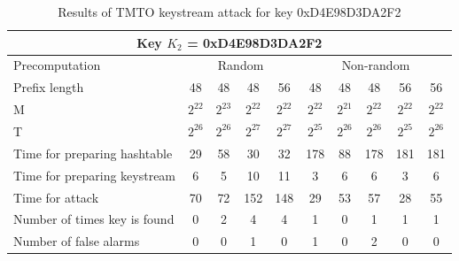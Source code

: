 \begin{table}[ht!]
\begin{center}
\begin{tabular}{|p{3cm}||c|c|c|c|c|c|c|c|c|}
\hline
\multicolumn{10}{|c|}{\textbf{Key $K_2$ = 0xD4E98D3DA2F2}} \\ \hline \hline
Precomputation 	& \multicolumn{4}{c|}{Random} & \multicolumn{5}{c|}{Non-random} \\ \hline
Prefix length										&	48 				&	48 				&	48 				&	56 				&	48 				&	48				&	48 				&	56 				&	56  			\\ \hline
M																&	$2^{22}$ 	&	$2^{23}$ 	&	$2^{22}$ 	&	$2^{22}$ 	&	$2^{22}$ 	&	$2^{21}$ 	&	$2^{22}$ 	&	$2^{22}$ 	& $2^{22}$	\\ \hline
T	  														&	$2^{26}$ 	&	$2^{26}$ 	&	$2^{27}$ 	&	$2^{27}$	&	$2^{25}$ 	&	$2^{26}$ 	&	$2^{26}$ 	& $2^{25}$ 	& $2^{26}$	\\ \hline
Time for preparing hashtable		&	29 				&	58 				&	30 				&	32 				&	178 			&	88				& 178				&	181 			& 181				\\ \hline
Time for preparing keystream		&	6 				&	5 				&	10 				&	11 				&	3 				&	6					& 6					&	3					& 6					\\ \hline
Time for attack									&	70 				&	72 				&	152 			&	148 			&	29 				&	53				& 57 				&	28 				& 55				\\ \hline
Number of times key is found		&	0 				&	2 				&	4 				&	4 				&	1 				&	0					& 1 				&	1 				& 1					\\ \hline
Number of false alarms					&	0 				&	0 				&	1 				&	0 				&	1 				&	0					& 2 				& 0 				& 0					\\ \hline
\end{tabular}
\end{center}
\caption{Results of TMTO keystream attack for key 0xD4E98D3DA2F2}
\label{tab:keystream-attack-results-key2}
\end{table}


